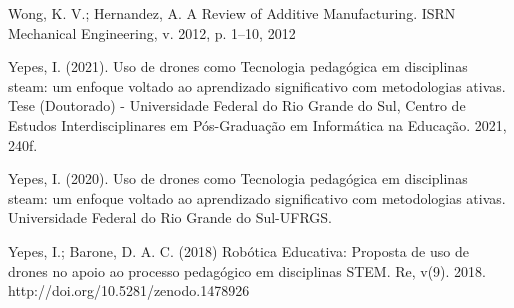 \documentclass[conference]{IEEEtran}
\begin{document}
\begin{thebibliography}{00}
     Wong, K. V.; Hernandez, A. A Review of Additive Manufacturing. ISRN Mechanical Engineering, v. 2012, p. 1–10, 2012
    
     Yepes, I. (2021). Uso de drones como Tecnologia pedagógica em disciplinas steam: um enfoque voltado ao aprendizado significativo com metodologias ativas. Tese (Doutorado) - Universidade Federal do Rio Grande do Sul, Centro de Estudos Interdisciplinares em Pós-Graduação em Informática na Educação. 2021, 240f. 
    
     Yepes, I. (2020). Uso de drones como Tecnologia pedagógica em disciplinas steam: um enfoque voltado ao aprendizado significativo com metodologias
    ativas. Universidade Federal do Rio Grande do Sul-UFRGS.
    
     Yepes, I.; Barone, D. A. C. (2018) Robótica Educativa: Proposta de uso de drones no apoio ao processo pedagógico em disciplinas STEM. Re, v(9). 2018. http://doi.org/10.5281/zenodo.1478926
\end{thebibliography}
\end{document}
